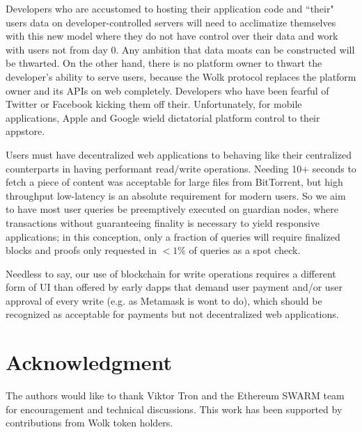 \documentclass[journal]{IEEEtran}
\begin{document}
Developers who are accustomed to hosting their application code and ``their" users data on developer-controlled servers will need to  acclimatize themselves with this new model where they do not have control over their data and work with users not from day 0.  Any ambition that data moats can be constructed will be thwarted.  On the other hand, there is no platform owner to thwart the developer's ability to serve users, because the Wolk protocol replaces the platform owner and its APIs on web completely.  Developers who have been fearful of Twitter or Facebook kicking them off their.  Unfortunately, for mobile applications, Apple and Google wield dictatorial platform control to their appstore.

Users must have decentralized web applications to behaving like their centralized counterparts in having performant read/write operations.  Needing 10+ seconds to fetch a piece of content was acceptable for large files from BitTorrent, but high throughput low-latency is an absolute requirement for modern users.  So we aim to have most user queries be preemptively executed on guardian nodes, where transactions without guaranteeing finality is necessary to yield responsive applications; in this conception, only a fraction of queries will require finalized blocks and proofs only requested in $<1\%$ of queries as a spot check.

Needless to say, our use of blockchain for write operations requires a different form of UI than offered by early dapps that demand user payment and/or user approval of every write (e.g. as Metamask is wont to do), which should be recognized as acceptable for payments but not decentralized web applications.




\section*{Acknowledgment}

The authors would like to thank Viktor Tron and the Ethereum SWARM team
for encouragement and technical discussions.
This work has been supported by contributions from
Wolk token holders.
\end{document}
